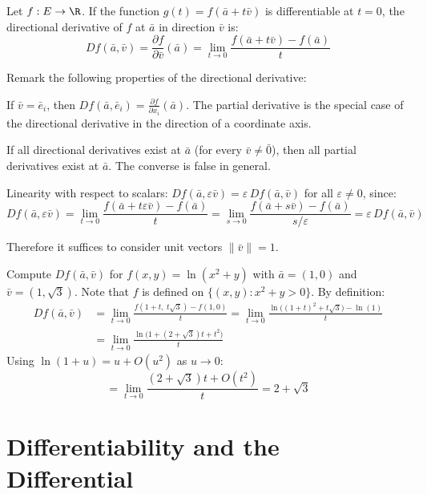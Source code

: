 \begin{definition}
    Let $f: E \to \R$. If the function $g(t) = f(\bar{a} + t\bar{v})$ is differentiable at $t = 0$, the directional derivative of $f$ at $\bar{a}$ in direction $\bar{v}$ is:
    \[
        Df(\bar{a},\bar{v}) = \frac{\partial f}{\partial \bar{v}}(\bar{a}) = \lim_{t \to 0} \frac{f(\bar{a} + t\bar{v}) - f(\bar{a})}{t}
    \]
\end{definition}
Remark the following properties of the directional derivative:
\begin{citemize}
    \item If $\bar{v} = \bar{e}_i$, then $Df(\bar{a}, \bar{e}_i) = \frac{\partial f}{\partial x_i}(\bar{a})$. The partial derivative is the special case of the directional derivative in the direction of a coordinate axis.
    \item If all directional derivatives exist at $\bar{a}$ (for every $\bar{v} \neq \bar{0}$), then all partial derivatives exist at $\bar{a}$. The converse is false in general.
    \item Linearity with respect to scalars: $Df(\bar{a}, \varepsilon\bar{v}) = \varepsilon\, Df(\bar{a}, \bar{v})$ for all $\varepsilon \neq 0$, since:
    \[
        Df(\bar{a}, \varepsilon\bar{v}) = \lim_{t \to 0} \frac{f(\bar{a} + t\varepsilon\bar{v}) - f(\bar{a})}{t} = \lim_{s \to 0} \frac{f(\bar{a} + s\bar{v}) - f(\bar{a})}{s/\varepsilon} = \varepsilon\, Df(\bar{a}, \bar{v})
    \]
    \item Therefore it suffices to consider unit vectors $\|\bar{v}\| = 1$.
\end{citemize}

\begin{eg}
    Compute $Df(\bar{a}, \bar{v})$ for $f(x,y) = \ln(x^2 + y)$ with $\bar{a} = (1, 0)$ and $\bar{v} = (1, \sqrt{3})$.
    Note that $f$ is defined on $\{(x,y) : x^2 + y > 0\}$. By definition:
    \begin{align*}
        Df(\bar{a}, \bar{v}) &= \lim_{t \to 0} \frac{f(1+t,\ t\sqrt{3}) - f(1, 0)}{t} = \lim_{t \to 0} \frac{\ln\bigl((1+t)^2 + t\sqrt{3}\bigr) - \ln(1)}{t} \\
        &= \lim_{t \to 0} \frac{\ln\bigl(1 + (2 + \sqrt{3})t + t^2\bigr)}{t}
    \end{align*}
    Using $\ln(1 + u) = u + O(u^2)$ as $u \to 0$:
    \[
        = \lim_{t \to 0} \frac{(2 + \sqrt{3})t + O(t^2)}{t} = 2 + \sqrt{3}
    \]
\end{eg}

\section{Differentiability and the Differential}

